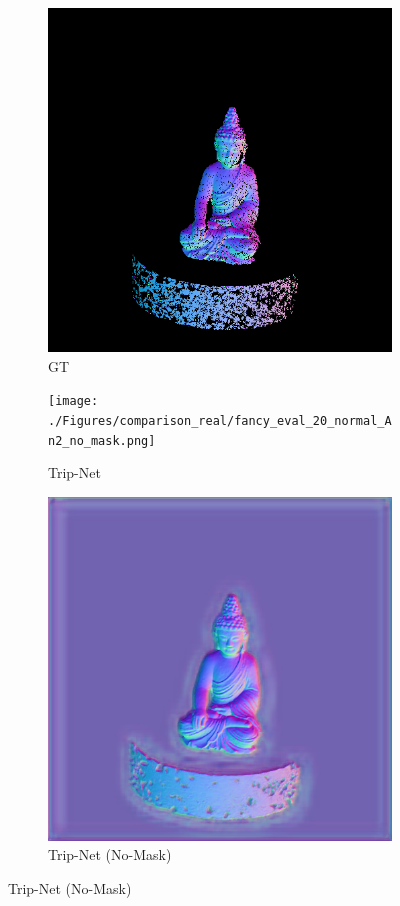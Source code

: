 \begin{figure}[H]
	\centering
	\captionsetup{width=\linewidth}
	\begin{subfigure}[b]{0.32\linewidth}
		\includegraphics[width=\linewidth]{./Figures/comparison_real/fancy_eval_20_groundtruth.png}
		\caption{GT}
	\end{subfigure}
	\begin{subfigure}[b]{0.32\linewidth}
	\texttt{[image: ./Figures/comparison\_real/fancy\_eval\_20\_normal\_An2\_no\_mask.png]}
	\caption{Trip-Net}
	\end{subfigure}
	\begin{subfigure}[b]{0.32\linewidth}
		\includegraphics[width=\linewidth]{./Figures/comparison_real/fancy_eval_20_normal_An2-real-resume-616.png}
		\caption{Trip-Net (No-Mask)}
	\end{subfigure}
	

\end{figure}

